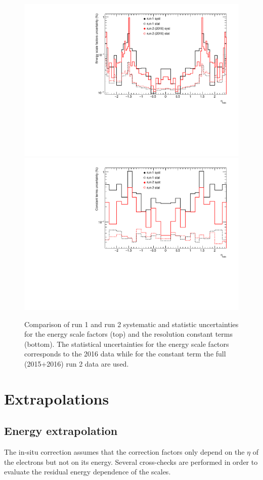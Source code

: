 \begin{figure}
\centering
\includegraphics[width=0.9\linewidth]{Figures/CompareSystRun_alpha.pdf}\\
\includegraphics[width=0.9\linewidth]{Figures/CompareSystRun_c.pdf}
\caption{\label{fig:Calibration_CompareScaleRuns}
  Comparison of run 1 and run 2 systematic and statistic uncertainties for the energy scale factors (top) and the resolution constant terms (bottom).
  The statistical uncertainties for the energy scale factors corresponds to the 2016 data while for the constant term the full (2015+2016) run 2 data are used.
}
\end{figure}


\section{Extrapolations}

\subsection{Energy extrapolation}
The in-situ correction assumes that the correction factors only depend on the $\eta$ of the electrons but not on its energy.
Several cross-checks are performed in order to evaluate the residual energy dependence of the scales.

